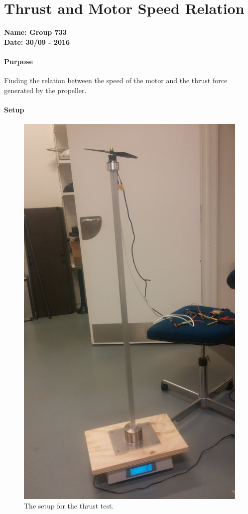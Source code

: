 \chapter{Thrust and Motor Speed Relation}\label{app:potentiometerLin} 
\textbf{Name: Group 733}\\
\textbf{Date: 30/09 - 2016}

\subsubsection{Purpose}
Finding the relation between the speed of the motor and the thrust force generated by the propeller.

\subsubsection{Setup}
\begin{figure}[H]
	\centering
	\includegraphics[scale=0.05,angle =-90]{figures/ThrustTestSetup}
	\caption{The setup for the thrust test.}
	\label{ThrustTest}
\end{figure}

